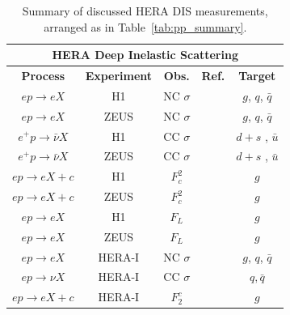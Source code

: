 \documentclass[12pt,twoside,openright]{report}
\begin{document}
\begin{spacing}{1.5}
\begin{table}
\begin{center}
\begin{tabular}{|c|c|c|c|c|}
\hline
\multicolumn{5}{|c|}{\textbf{HERA Deep Inelastic Scattering}}\\
\hline
\textbf{Process} & \textbf{Experiment} & \textbf{Obs.} &\textbf{Ref.} &  \textbf{Target} \\
\hline\hline
$e p \to e X$ & H1 & NC $\sigma$ & \cite{Adloff:2000qk,Adloff:2000qj,Adloff:2003uh} & $g$, $q$, $\bar{q}$\\
$e p \to e X$ & ZEUS & NC $\sigma$& \cite{Breitweg:1998dz,Chekanov:2001qu,Chekanov:2002ej,Chekanov:2003yv}& $g$, $q$, $\bar{q}$\\
\hline
$e^+ p \to \bar{\nu} X$ & H1 & CC $\sigma$& \cite{Chekanov:2003vw} & $d + s$ , $\bar{u}$ \\
$e^+ p \to \bar{\nu} X$ & ZEUS & CC $\sigma$ & \cite{Adloff:2003uh} & $d + s$ , $\bar{u}$ \\
\hline
$e p \to e X+c$ & H1 & $F^2_c$ & \cite{Chekanov:2003rb,Chekanov:2007ch,Aktas:2005iw,Aktas:2004az} & $g$\\
$e p \to e X+c$ & ZEUS & $F^2_c$ & \cite{Adloff:1996xq,Adloff:2001zj,Breitweg:1999ad} & $g$\\
\hline
$e p \to e X$ & H1 & $F_L$ & \cite{Andreev:2013vha} & $g$ \\
$e p \to e X$ & ZEUS & $F_L$ & \cite{Chekanov:2009na} & $g$\\
\hline\hline
$e p \to e X$ & HERA-I & NC $\sigma$&\cite{aaron:2009wt}& $g$, $q$, $\bar{q}$ \\
$e p \to \nu X$ & HERA-I & CC $\sigma$&\cite{aaron:2009wt}& $q, \bar{q}$\\
\hline
$e p \to e X+c$ & HERA-I & $F_2^c$ & \cite{Abramowicz:1900rp} & $g$\\
\hline
\end{tabular}
\end{center}
\label{tab:HERA_summary}
\caption{Summary of discussed HERA DIS measurements, arranged as in Table~\ref{tab:pp_summary}.}
\end{table}%


\end{spacing}
\end{document}
